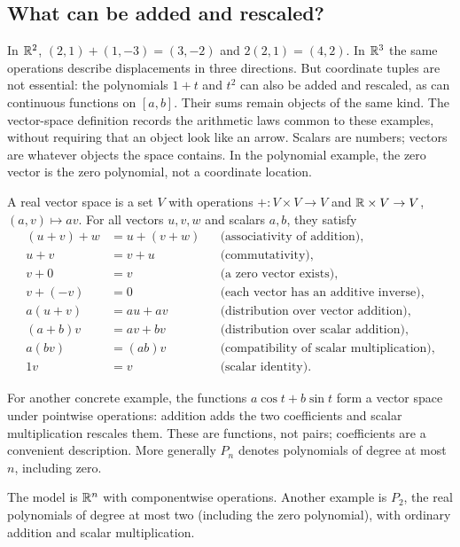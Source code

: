 \subsection{What can be added and rescaled?}
In $\mathbb{R}^2$, $(2,1)+(1,-3)=(3,-2)$ and $2(2,1)=(4,2)$.
In $\mathbb{R}^3$ the same operations describe displacements in three directions.
But coordinate tuples are not essential: the polynomials $1+t$ and
$t^2$ can also be added and rescaled, as can continuous functions on
$[a,b]$. Their sums remain objects of the same kind. The vector-space
definition records the arithmetic laws common to these examples, without
requiring that an object look like an arrow. Scalars are numbers; vectors
are whatever objects the space contains. In the polynomial example, the
zero vector is the zero polynomial, not a coordinate location.
\begin{definition}
A real vector space is a set $V$ with operations
$+:V\times V\to V$ and $\mathbb{R}\times V\to V$, $(a,v)\mapsto av$.
For all vectors $u,v,w$ and scalars $a,b$, they satisfy
\begin{align*}
(u+v)+w&=u+(v+w) &&\text{(associativity of addition)},\\
u+v&=v+u &&\text{(commutativity)},\\
v+0&=v &&\text{(a zero vector exists)},\\
v+(-v)&=0 &&\text{(each vector has an additive inverse)},\\
a(u+v)&=au+av &&\text{(distribution over vector addition)},\\
(a+b)v&=av+bv &&\text{(distribution over scalar addition)},\\
a(bv)&=(ab)v &&\text{(compatibility of scalar multiplication)},\\
1v&=v &&\text{(scalar identity)}.
\end{align*}
\end{definition}
For another concrete example, the functions $a\cos t+b\sin t$ form a
vector space under pointwise operations: addition adds the two coefficients
and scalar multiplication rescales them. These are functions, not pairs;
coefficients are a convenient description. More generally $P_n$ denotes
polynomials of degree at most $n$, including zero.

The model is $\mathbb{R}^n$ with componentwise operations. Another example is
$P_2$, the real polynomials of degree at most two (including the zero
polynomial), with ordinary addition and scalar multiplication.

